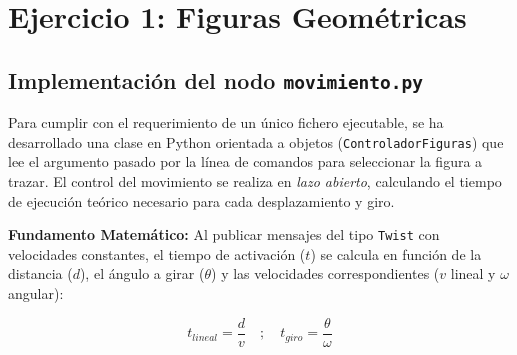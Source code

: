 \section{Ejercicio 1: Figuras Geométricas}
\subsection*{Implementación del nodo \texttt{movimiento.py}}

Para cumplir con el requerimiento de un único fichero ejecutable, se ha desarrollado una clase en Python orientada a objetos (\texttt{ControladorFiguras}) que lee el argumento pasado por la línea de comandos para seleccionar la figura a trazar. El control del movimiento se realiza en \textit{lazo abierto}, calculando el tiempo de ejecución teórico necesario para cada desplazamiento y giro.

\textbf{Fundamento Matemático:}
Al publicar mensajes del tipo \texttt{Twist} con velocidades constantes, el tiempo de activación ($t$) se calcula en función de la distancia ($d$), el ángulo a girar ($\theta$) y las velocidades correspondientes ($v$ lineal y $\omega$ angular):

\begin{equation}
	t_{lineal} = \frac{d}{v} \quad ; \quad t_{giro} = \frac{\theta}{\omega}
\end{equation}

